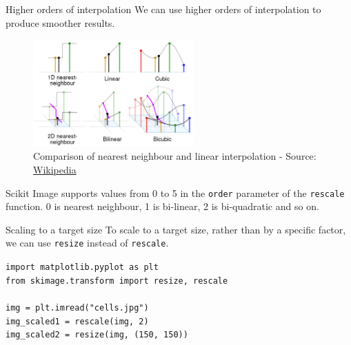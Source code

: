 \documentclass[9pt, aspectratio=169]{beamer}
\begin{document}
\begin{frame}
    {Higher orders of interpolation}
    We can use higher orders of interpolation to produce smoother results. \\
    \begin{figure}

        \centering
        \includegraphics[width=0.55\textwidth]{interpolations.png}
        \caption{Comparison of nearest neighbour and linear interpolation - Source: \href{https://en.wikipedia.org/wiki/Nearest-neighbor_interpolation}{Wikipedia}}
    \end{figure}

    Scikit Image supports values from 0 to 5 in the \texttt{order} parameter of the \texttt{rescale} function. 0 is nearest neighbour, 1 is bi-linear, 2 is bi-quadratic and so on.
\end{frame}

\begin{frame}
    {Scaling to a target size}
    To scale to a target size, rather than by a specific factor, we can use \texttt{resize} instead of \texttt{rescale}.

    \begin{codebox}
        \texttt{import matplotlib.pyplot as plt\\
            from skimage.transform import resize, rescale\\
            \\
            img = plt.imread("cells.jpg")\\
            img\_scaled1 = rescale(img, 2)\\
            img\_scaled2 = resize(img, (150, 150))
        }
    \end{codebox}
\end{frame}
\end{document}
